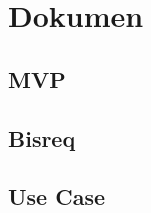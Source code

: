 \documentclass[a4paper,oneside,11pt]{book}
\begin{document}
\renewcommand{\cftchappresnum}{Bab~}
\renewcommand{\cftchapaftersnum}{.}
\renewcommand{\cftchapnumwidth}{3.5em}
\renewcommand{\cftchapfont}{\bfseries}
\renewcommand{\cftchappagefont}{\bfseries}

\setlength{\cftbeforechapskip}{0.8em} %
\setlength{\cftbeforesecskip}{0.2em}  %
\renewcommand{\cftsecfont}{\normalfont}
\renewcommand{\cftsubsecfont}{\normalfont}

\renewcommand{\contentsname}{\centering Daftar Isi}
\renewcommand{\listfigurename}{\centering Daftar Gambar}
\renewcommand{\lstlistlistingname}{\centering Daftar Kode}

\renewcommand{\cftloftitlefont}{\hfill\normalfont\LARGE\bfseries}
\renewcommand{\cftafterloftitle}{\hfill}

\tableofcontents

\newpage
\listoffigures

\newpage



\chapter{Dokumen}
\section{MVP}
\section{Bisreq}

\newpage
\section{Use Case}

\end{document}
